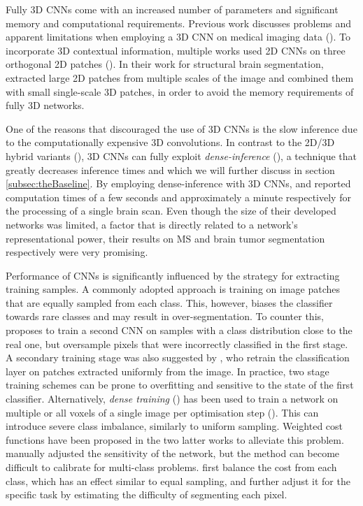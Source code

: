 \documentclass[preprint,authoryear,12pt]{elsarticle}
\begin{document}
Fully 3D CNNs come with an increased number of parameters and significant memory and computational requirements. Previous work discusses problems and apparent limitations when employing a 3D CNN on medical imaging data (\cite{prasoon2013Knee, Li2014a, Roth2014}). To incorporate 3D contextual information, multiple works used 2D CNNs on three orthogonal 2D patches (\cite{prasoon2013Knee, Roth2014, lyksborg2015ensemble}). In their work for structural brain segmentation, \cite{Brebisson2015a} extracted large 2D patches from multiple scales of the image and combined them with small single-scale 3D patches, in order to avoid the memory requirements of fully 3D networks.

One of the reasons that discouraged the use of 3D CNNs is the slow inference due to the computationally expensive 3D convolutions. In contrast to the 2D/3D hybrid variants (\cite{Roth2014, Brebisson2015a}), 3D CNNs can fully exploit \textit{dense-inference} (\cite{LeCun1998,Sermanet2013}), a technique that greatly decreases inference times and which we will further discuss in section \ref{subsec:theBaseline}. By employing dense-inference with 3D CNNs, \cite{Brosch2015} and \cite{urban2014CnnBrats} reported computation times of a few seconds and approximately a minute respectively for the processing of a single brain scan. Even though the size of their developed networks was limited, a factor that is directly related to a network's representational power, their results on MS and brain tumor segmentation respectively were very promising.

Performance of CNNs is significantly influenced by the strategy for extracting training samples. A commonly adopted approach is training on image patches that are equally sampled from each class. This, however, biases the classifier towards rare classes and may result in over-segmentation. To counter this, \cite{Ciresan2013} proposes to train a second CNN on samples with a class distribution close to the real one, but oversample pixels that were incorrectly classified in the first stage. A secondary training stage was also suggested by \cite{Havei2015Journal}, who retrain the classification layer on patches extracted uniformly from the image. In practice, two stage training schemes can be prone to overfitting and sensitive to the state of the first classifier. Alternatively, \textit{dense training} (\cite{Long2014}) has been used to train a network on multiple or all voxels of a single image per optimisation step (\cite{urban2014CnnBrats, Brosch2015, Ronneberger2015}). This can introduce severe class imbalance, similarly to uniform sampling. Weighted cost functions have been proposed in the two latter works to alleviate this problem. \cite{Brosch2015} manually adjusted the sensitivity of the network, but the method can become difficult to calibrate for multi-class problems. \cite{Ronneberger2015} first balance the cost from each class, which has an effect similar to equal sampling, and further adjust it for the specific task by estimating the difficulty of segmenting each pixel.
\end{document}
